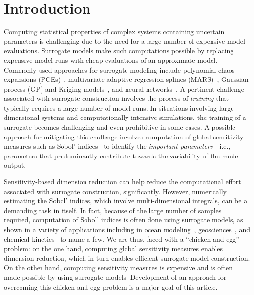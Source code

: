 \section{Introduction}
\label{sec:intro}

Computing statistical properties of 
complex systems containing uncertain parameters is
challenging due to the need for a large number of expensive model evaluations. 
Surrogate models make such computations possible by replacing 
expensive model runs with cheap evaluations of an approximate model.
%
%
Commonly used approaches for surrogate modeling include polynomial chaos
expansions (PCEs)~\cite{Xiu:2002,Ghanem:2003,Olivier:2010}, multivariate
adaptive regression splines (MARS)~\cite{friedman93}, Gaussian process
(GP) and Kriging models~\cite{Rasmussen:2004,Stein:2012}, and neural
networks~\cite{Funahashi:1989,Specht:1990}. A pertinent
challenge associated with surrogate construction involves the process of
\textit{training} that typically requires a large number of model runs.  In
situations involving large-dimensional systems and computationally intensive
simulations, the training of a surrogate becomes challenging and
even prohibitive in some cases. A possible approach for mitigating this
challenge involves computation of global sensitivity measures such as Sobol'
indices~\cite{Sobol93} to identify
the \emph{important parameters}---i.e., parameters that predominantly
contribute towards the variability of the model output. 

Sensitivity-based
dimension reduction can help reduce the computational effort associated with
surrogate construction,
significantly. However, numerically estimating the Sobol' indices, which
involve multi-dimensional integrals, can be a demanding task in itself. In
fact, because of the large number of samples required, computation of Sobol'
indices is often done using surrogate models, as shown in a variety of 
applications including in ocean
modeling~\cite{AlexanderianWinokurSrajEtAl12,LiIskandaraniLeHenaffEtAl16},
geosciences~\cite{Namhata2016OladyshkinDilmoreEtAl16,deman2016,SaadAlexanderianPrudhommeEtAl17},
and chemical kinetics~\cite{DegasperiGilmore08,navarro2016global,Vohra:2014} to
name a few. 
We are thus, faced with a ``chicken-and-egg'' problem: on the one hand,
computing global sensitivity measures enables dimension reduction, which in turn
enables efficient surrogate model construction.  On the other hand, computing
sensitivity measures is expensive and is often made possible by using
surrogate models. Development of an approach for 
overcoming this chicken-and-egg problem is a major goal of this article. 

